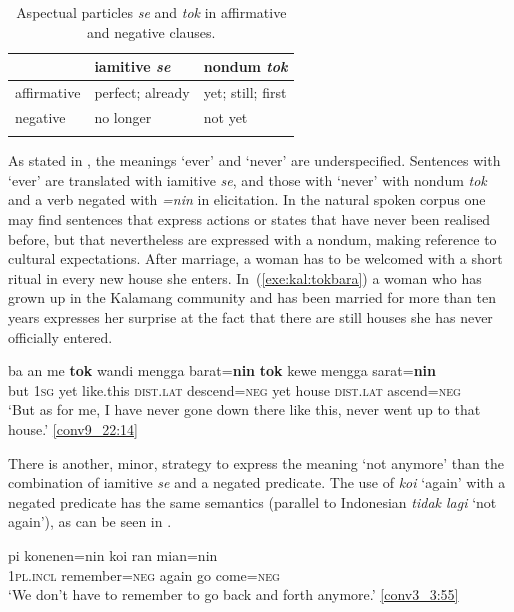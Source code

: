 \documentclass[output=paper,colorlinks,citecolor=brown,draft]{langscibook}
\begin{document}
 \begin{table}
 	\caption{Aspectual particles \textit{se} and \textit{tok} in affirmative and negative clauses.}
 	\label{tab:kal:setok}
 	\begin{tabular}{lll} 
 		\lsptoprule
 		& iamitive \textit{se} & nondum \textit{tok}\\ 
 		\midrule
 		affirmative  &   perfect; already  &  yet; still; first    \\
 		negative  &   no longer &  not yet  \\
 		\lspbottomrule
 	\end{tabular}
 \end{table}

As stated in , the meanings `ever' and `never' are underspecified. Sentences with `ever' are translated with iamitive \textit{se}, and those with `never' with nondum \textit{tok} and a verb negated with \textit{=nin} in elicitation. In the natural spoken corpus one may find sentences that express actions or states that have never been realised before, but that nevertheless are expressed with a nondum, making reference to cultural expectations. After marriage, a woman has to be welcomed with a short ritual in every new house she enters. In~(\ref{exe:kal:tokbara}) a woman who has grown up in the Kalamang community and has been married for more than ten years expresses her surprise at the fact that there are still houses she has never officially entered.

\ea \label{exe:kal:tokbara}
\gll ba an me \textbf{tok} wandi mengga barat=\textbf{nin} \textbf{tok} kewe mengga sarat=\textbf{nin}\\
but \textsc{1sg} {\glme} yet like.this \textsc{dist.lat} descend=\textsc{neg} yet house \textsc{dist.lat} ascend=\textsc{neg}\\
\glt `But as for me, I have never gone down there like this, never went up to that house.' {\href{http://hdl.handle.net/10050/00-0000-0000-0004-1B9F-F}{[conv9\_22:14]}}
\z

There is another, minor, strategy to express the meaning `not anymore' than the combination of iamitive \textit{se} and a negated predicate. The use of \textit{koi} `again' with a negated predicate has the same semantics (parallel to Indonesian \textit{tidak lagi} `not again'), as can be seen in .

\ea \label{exe:kal:koinin}
\gll pi konenen=nin koi ran mian=nin\\
\textsc{1pl.incl} remember=\textsc{neg} again go come=\textsc{neg}\\
\glt `We don't have to remember to go back and forth anymore.' {\href{http://hdl.handle.net/10050/00-0000-0000-0004-1BCD-C}{[conv3\_3:55]}}
\z 
\end{document}
